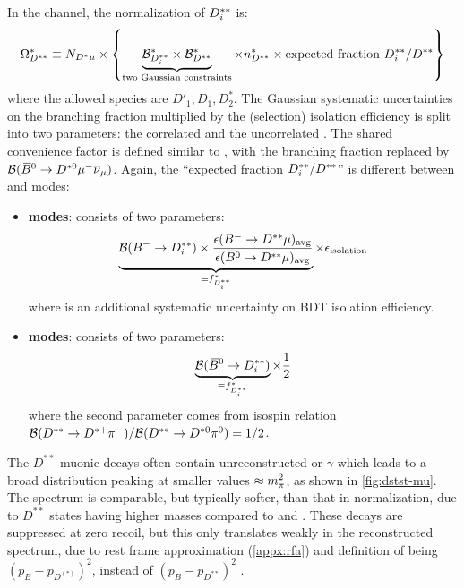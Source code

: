In the \Dstar channel, the normalization of $D^{**}_i$ is:
\begin{equation}
    \Omega_{D^{**}}^* \equiv N_{{{D}^*}\mu} \times \left\{
        \underbrace{\mathcal{B}_{D^{**}_i}^{*} \times \mathcal{B}_{D^{**}}^{*}}_\text{two Gaussian constraints}
        \times n_{D^{**}}^{*} \times
        \text{expected fraction $D^{**}_i/D^{**}$}
    \right\}
    \label{eqn:dstst-yield-dst}
\end{equation}
where the allowed species are $D'_1, D_1, D_2^*$.
The Gaussian systematic uncertainties on the branching fraction multiplied by
the (selection) isolation efficiency is split into two parameters:
the correlated \fitBFDstpi and the uncorrelated \fitBFDi.
The shared convenience factor \fitNDststz is defined similar to \fitNDststDz,
with the branching fraction replaced by
$\mathcal{B}({{\kern 0.18em\overline{\kern -0.18em B}}{}^0} \rightarrow {\ensuremath{{D}^{*0}}} {\ensuremath{\mu^-}}{\ensuremath{{\overline{\nu}}_\mu}})$.
Again, the ``expected fraction $D^{**}_i/D^{**}$'' is different between \Bm
and \Bzb modes:
\begin{itemize}
    \item \textbf{\Bm modes}:
        consists of two parameters:
        \begin{equation}
            \underbrace{
                \mathcal{B}({{{B}^-}} \rightarrow D^{**}_i) \times
                \frac{\epsilon({{{B}^-}} \rightarrow D^{**}\mu)_\text{avg}}{
                    \epsilon({{\kern 0.18em\overline{\kern -0.18em B}}{}^0} \rightarrow D^{**}\mu)_\text{avg}
                }
            }_{\equiv f_{D^{**}_i}^{*}}
            \times \epsilon_\text{isolation}
        \end{equation}
        where \fitisolationsys is an additional systematic uncertainty on
        BDT isolation efficiency.

    \item \textbf{\Bzb modes}:
        consists of two parameters:
        \begin{equation}
            \underbrace{\mathcal{B}({{\kern 0.18em\overline{\kern -0.18em B}}{}^0} \rightarrow D^{**}_i)}_{\equiv f_{D^{**}_i}^{*}}
            \times \frac{1}{2}
        \end{equation}
        where the second parameter comes from isospin relation
        $\mathcal{B}(D^{**} \rightarrow {\ensuremath{{D}^{*+}}}{\ensuremath{{\pi}^-}}) /
        \mathcal{B}(D^{**} \rightarrow {\ensuremath{{D}^{*0}}}{\ensuremath{{\pi}^0}}) = 1/2$.
\end{itemize}

The $D^{**}$ muonic decays often contain unreconstructed \piz or $\gamma$ which
leads to a broad \mmSq distribution peaking at smaller values
$\approx m^2_{\pi}$,
as shown in \cref{fig:dstst-mu}.
The \el spectrum is comparable, but typically softer, than that in normalization,
due to $D^{**}$ states having higher masses compared to \Dz and \Dstar.
These decays are suppressed at zero recoil,
but this only translates weakly in the reconstructed \qSq spectrum,
due to rest frame approximation (\cref{appx:rfa}) and definition of \qSq being
$(p_B - p_{D^{(*)}})^2$, instead of $(p_B - p_{D^{**}})^2$
\cite{LHCb-ANA-2020-056}.

